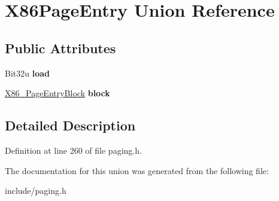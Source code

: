 \hypertarget{unionX86PageEntry}{\section{X86\-Page\-Entry Union Reference}
\label{unionX86PageEntry}
}
\subsection*{Public Attributes}
\begin{DoxyCompactItemize}
\item 
\hypertarget{unionX86PageEntry_aa152f3141962481fe4bf26569e38a6ba}{Bit32u {\bfseries load}}\label{unionX86PageEntry_aa152f3141962481fe4bf26569e38a6ba}

\item 
\hypertarget{unionX86PageEntry_ae559f83e44673e73569cd20584ee609c}{\hyperlink{structX86__PageEntryBlock}{X86\-\_\-\-Page\-Entry\-Block} {\bfseries block}}\label{unionX86PageEntry_ae559f83e44673e73569cd20584ee609c}

\end{DoxyCompactItemize}


\subsection{Detailed Description}


Definition at line 260 of file paging.\-h.



The documentation for this union was generated from the following file\-:\begin{DoxyCompactItemize}
\item 
include/paging.\-h\end{DoxyCompactItemize}
